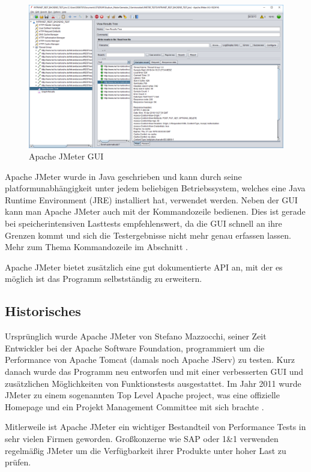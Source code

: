 \documentclass[a4paper,12pt]{article}
\begin{document}
\begin{figure}[htb]%
 \centering
    \includegraphics[width=1\textwidth]{bilder/jmeter_1.png}
  \caption{Apache JMeter GUI}
  \label{fig:jmeter_gui}
\end{figure}
Apache JMeter wurde in Java geschrieben und kann durch seine platformunabhängigkeit unter jedem beliebigen Betriebssystem, welches eine Java Runtime Environment (JRE) installiert hat, verwendet werden. Neben der GUI kann man Apache JMeter auch mit der Kommandozeile bedienen. Dies ist gerade bei speicherintensiven Lasttests empfehlenswert, da die GUI schnell an ihre Grenzen kommt und sich die Testergebnisse nicht mehr genau erfassen lassen. Mehr zum Thema Kommandozeile im Abschnitt .

Apache JMeter bietet zusätzlich eine gut dokumentierte API an, mit der es möglich ist das Programm selbstständig zu erweitern.

\subsection{Historisches}
Ursprünglich wurde Apache JMeter von Stefano Mazzocchi, seiner Zeit Entwickler bei der Apache Software Foundation, programmiert um die Performance von Apache Tomcat (damals noch Apache JServ) zu testen. Kurz danach wurde das Programm neu entworfen und mit einer verbesserten GUI und zusätzlichen Möglichkeiten von Funktionstests ausgestattet. Im Jahr 2011 wurde JMeter zu einem sogenannten Top Level Apache project, was eine offizielle Homepage und ein Projekt Management Committee mit sich brachte \cite{online:officialJMeter}.

Mitlerweile ist Apache JMeter ein wichtiger Bestandteil von Performance Tests in sehr vielen Firmen geworden. Großkonzerne wie SAP oder 1\&1 verwenden regelmäßig JMeter um die Verfügbarkeit ihrer Produkte unter hoher Last zu prüfen. 
\end{document}
